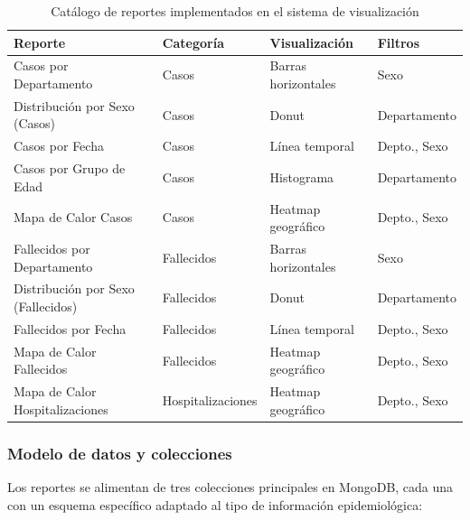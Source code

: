 \documentclass[12pt,a4paper]{article}
\begin{document}
\begin{table}[H]
    \centering
    \caption{Catálogo de reportes implementados en el sistema de visualización}
    \label{tab:catalogo-reportes}
    \begin{tabular}{@{}llll@{}}
        \toprule
        \textbf{Reporte}                   & \textbf{Categoría} & \textbf{Visualización} & \textbf{Filtros} \\
        \midrule
        Casos por Departamento             & Casos              & Barras horizontales    & Sexo             \\
        Distribución por Sexo (Casos)      & Casos              & Donut                  & Departamento     \\
        Casos por Fecha                    & Casos              & Línea temporal         & Depto., Sexo     \\
        Casos por Grupo de Edad            & Casos              & Histograma             & Departamento     \\
        Mapa de Calor Casos                & Casos              & Heatmap geográfico     & Depto., Sexo     \\
        \midrule
        Fallecidos por Departamento        & Fallecidos         & Barras horizontales    & Sexo             \\
        Distribución por Sexo (Fallecidos) & Fallecidos         & Donut                  & Departamento     \\
        Fallecidos por Fecha               & Fallecidos         & Línea temporal         & Depto., Sexo     \\
        Mapa de Calor Fallecidos           & Fallecidos         & Heatmap geográfico     & Depto., Sexo     \\
        \midrule
        Mapa de Calor Hospitalizaciones    & Hospitalizaciones  & Heatmap geográfico     & Depto., Sexo     \\
        \bottomrule
    \end{tabular}
\end{table}

\subsubsection{Modelo de datos y colecciones}

Los reportes se alimentan de tres colecciones principales en MongoDB, cada una con un esquema específico adaptado al tipo de información epidemiológica:
\end{document}
